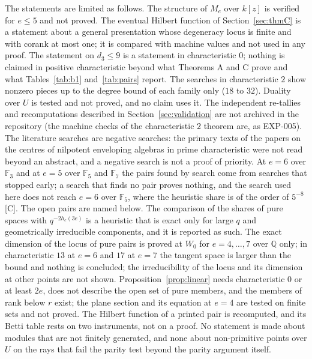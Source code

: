 \documentclass[11pt]{article}
\theoremstyle{definition}
\theoremstyle{remark}
\newcommand{\EXP}[1]{\mbox{EXP-#1}}
\newcommand{\Q}{\mathbb{Q}}
\newcommand{\F}{\mathbb{F}}
\begin{document}
The statements are limited as follows. The structure of $M_e$ over $k[z]$ is verified for $e\le5$ and not proved. The eventual Hilbert function of Section~\ref{sec:thmC} is a statement about a general presentation whose degeneracy locus is finite and with corank at most one; it is compared with machine values and not used in any proof. The statement on $d_3\le9$ is a statement in characteristic $0$; nothing is claimed in positive characteristic beyond what Theorems A and C prove and what Tables~\ref{tab:b1} and~\ref{tab:pairs} report. The searches in characteristic $2$ show nonzero pieces up to the degree bound of each family only ($18$ to $32$). Duality over $U$ is tested and not proved, and no claim uses it. The independent re-tallies and recomputations described in Section~\ref{sec:validation} are not archived in the repository (the machine checks of the characteristic $2$ theorem are, as \EXP{005}). The literature searches are negative searches: the primary texts of the papers on the centres of nilpotent enveloping algebras in prime characteristic were not read beyond an abstract, and a negative search is not a proof of priority. At $e=6$ over $\F_3$ and at $e=5$ over $\F_5$ and $\F_7$ the pairs found by search come from searches that stopped early; a search that finds no pair proves nothing, and the search used here does not reach $e=6$ over $\F_5$, where the heuristic share is of the order of $5^{-8}$ [C]. The open pairs are named below. The comparison of the shares of pure spaces with $q^{-2h_e(3e)}$ is a heuristic that is exact only for large $q$ and geometrically irreducible components, and it is reported as such. The exact dimension of the locus of pure pairs is proved at $W_0$ for $e=4,\dots,7$ over $\Q$ only; in characteristic $13$ at $e=6$ and $17$ at $e=7$ the tangent space is larger than the bound and nothing is concluded; the irreducibility of the locus and its dimension at other points are not shown. Proposition~\ref{prop:linear} needs characteristic $0$ or at least $2e$, does not describe the open set of pure members, and the members of rank below $r$ exist; the plane section and its equation at $e=4$ are tested on finite sets and not proved. The Hilbert function of a printed pair is recomputed, and its Betti table rests on two instruments, not on a proof. No statement is made about modules that are not finitely generated, and none about non-primitive points over $U$ on the rays that fail the parity test beyond the parity argument itself.
\end{document}
